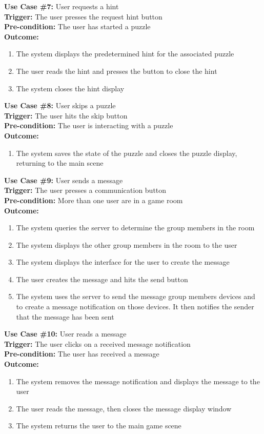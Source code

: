 \documentclass[12pt]{article}
\begin{document}
\textbf{Use Case \#7:} User requests a hint\\
\textbf{Trigger:} The user presses the request hint button\\
\textbf{Pre-condition:} The user has started a puzzle\\
\textbf{Outcome:}
\begin{enumerate}
	\item The system displays the predetermined hint for the associated puzzle
	\item The user reads the hint and presses the button to close the hint
	\item The system closes the hint display
\end{enumerate}
\textbf{Use Case \#8:} User skips a puzzle\\
\textbf{Trigger:} The user hits the skip button\\
\textbf{Pre-condition:} The user is interacting with a puzzle\\
\textbf{Outcome:}
\begin{enumerate}
	\item The system saves the state of the puzzle and closes the puzzle display, returning to the main scene
\end{enumerate}
\textbf{Use Case \#9:} User sends a message\\
\textbf{Trigger:} The user presses a communication button\\
\textbf{Pre-condition:} More than one user are in a game room\\
\textbf{Outcome:}
\begin{enumerate}
	\item The system queries the server to determine the group members in the room
	\item The system displays the other group members in the room to the user
        \item The system displays the interface for the user to create the message
        \item The user creates the message and hits the send button
        \item The system uses the server to send the message group members devices and to create a message notification on those devices. It then notifies the sender that the message has been sent
\end{enumerate}
\textbf{Use Case \#10:} User reads a message\\
\textbf{Trigger:} The user clicks on a received message notification\\
\textbf{Pre-condition:} The user has received a message\\
\textbf{Outcome:}
\begin{enumerate}
        \item The system removes the message notification and displays the message to the user
	\item The user reads the message, then closes the message display window
	\item The system returns the user to the main game scene
\end{enumerate}
\end{document}
